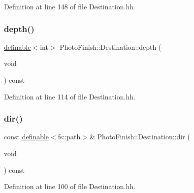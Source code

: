 Definition at line 148 of file Destination.\+hh.

\mbox{\label{class_photo_finish_1_1_destination_ae0711c1707ae64456eea948090030639}} 
\subsubsection{\texorpdfstring{depth()}{depth()}}
{\footnotesize\ttfamily \hyperlink{class_photo_finish_1_1definable}{definable}$<$int$>$ Photo\+Finish\+::\+Destination\+::depth (\begin{DoxyParamCaption}\item[{void}]{ }\end{DoxyParamCaption}) const\hspace{0.3cm}{\ttfamily [inline]}}



Definition at line 114 of file Destination.\+hh.

\mbox{\label{class_photo_finish_1_1_destination_aba22559bce295d7356ecd0c8ec0e4b61}} 
\subsubsection{\texorpdfstring{dir()}{dir()}}
{\footnotesize\ttfamily const \hyperlink{class_photo_finish_1_1definable}{definable}$<$fs\+::path$>$\& Photo\+Finish\+::\+Destination\+::dir (\begin{DoxyParamCaption}\item[{void}]{ }\end{DoxyParamCaption}) const\hspace{0.3cm}{\ttfamily [inline]}}



Definition at line 100 of file Destination.\+hh.

\mbox{\label{class_photo_finish_1_1_destination_a78d6a23570b288c6bc2bd4bd38798695}} 
